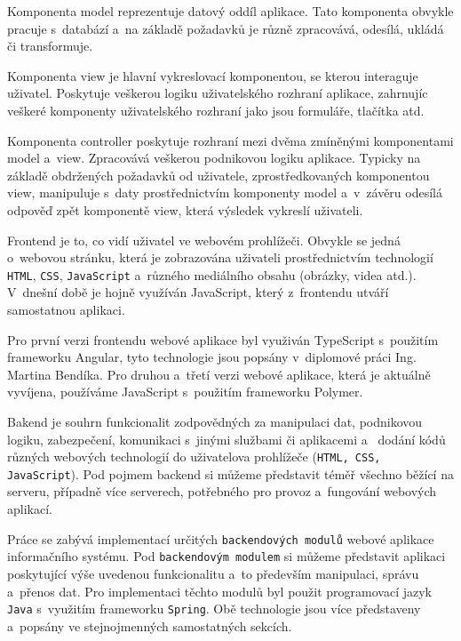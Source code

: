 \documentclass[12pt]{article}
\begin{document}
{Komponenta model reprezentuje datový oddíl aplikace. 
Tato komponenta obvykle pracuje s~databází a~na základě požadavků 
je různě zpracovává, odesílá, ukládá či transformuje.

Komponenta view je hlavní vykreslovací komponentou, se kterou interaguje uživatel.
Poskytuje veškerou logiku uživatelského rozhraní aplikace, 
zahrnujíc veškeré komponenty uživatelského rozhraní jako jsou formuláře, tlačítka 
atd.

Komponenta controller poskytuje rozhraní mezi dvěma zmíněnými komponentami
model a~view. Zpracovává veškerou podnikovou logiku aplikace. 
Typicky na základě obdržených požadavků od uživatele, zprostředkovaných komponentou
view, manipuluje s~daty prostřednictvím komponenty model a~v~závěru odesílá
odpověď zpět komponentě view, která výsledek vykreslí uživateli.



Frontend je to, co vidí uživatel ve webovém prohlížeči.
Obvykle se jedná o~webovou stránku, která je zobrazována uživateli prostřednictvím
technologií \texttt{HTML}, \texttt{CSS}, \texttt{JavaScript} a~různého mediálního obsahu (obrázky, videa atd.).
V~dnešní době je hojně využíván JavaScript, který z~frontendu utváří samostatnou aplikaci.

Pro první verzi frontendu webové aplikace byl využiván TypeScript
s~použitím frameworku Angular,
tyto technologie jsou popsány v~diplomové práci Ing. Martina Bendíka.
Pro druhou a~třetí verzi webové aplikace, která je aktuálně vyvíjena, 
používáme JavaScript s~použitím frameworku Polymer.


Bakend je souhrn funkcionalit zodpovědných za manipulaci dat, 
podnikovou logiku, zabezpečení, komunikaci s~jinými službami či aplikacemi a~
dodání kódů různých webových technologií do uživatelova prohlížeče (\texttt{HTML, CSS, JavaScript}).
\cite{odinuv}
Pod pojmem backend si můžeme představit téměř všechno běžící na serveru, 
případně více serverech, potřebného pro provoz a~fungování webových aplikací.

Práce se zabývá implementací určitých \texttt{backendových modulů} webové aplikace informačního systému.
Pod \texttt{backendovým modulem} si můžeme představit aplikaci
poskytující výše uvedenou funkcionalitu a~to především manipulaci, správu a~přenos dat.
Pro implementaci těchto modulů byl použit programovací jazyk \texttt{Java} s~využitím frameworku \texttt{Spring}.
Obě technologie jsou více představeny a~popsány ve stejnojmenných samostatných sekcích.

}
\end{document}
